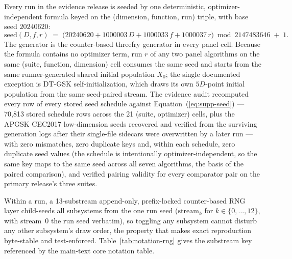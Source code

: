 \documentclass[algorithms,article,submit,moreauthors,pdftex]{Definitions/mdpi}
\newcommand{\dtgsk}{DT-GSK}
\begin{document}
Every run in the evidence release is seeded by one deterministic,
optimizer-independent formula keyed on the (dimension, function, run)
triple, with base seed $20240620$:
\begin{equation}\label{eq:supp-seed}
\mathrm{seed}(D, f, r) \;=\;
\bigl(20240620 + 1000003\,D + 1000033\,f + 1000037\,r\bigr)
\bmod 2147483646 \;+\; 1 .
\end{equation}
The generator is the counter-based threefry generator in every
panel cell.
Because the formula contains no optimizer term, run $r$ of any two panel
algorithms on the same (suite, function, dimension) cell consumes the
same seed and starts from the same runner-generated shared initial
population $X_{0}$; the single documented exception is \dtgsk{}
self-initialization, which draws its own $5D$-point initial population
from the same seed-paired stream.
The evidence audit recomputed every row of every stored seed
schedule against Equation~(\ref{eq:supp-seed}) --- 70{,}813 stored schedule rows
across the 21 (suite, optimizer) cells, plus the APGSK CEC2017
low-dimension seeds recovered and verified from the surviving generation
logs after their single-file sidecars were overwritten by a later run --- with zero mismatches, zero
duplicate keys and, within each schedule, zero duplicate seed values (the
schedule is intentionally optimizer-independent, so the same key maps to
the same seed across all seven algorithms, the basis of the paired
comparison), and verified pairing validity for every comparator pair on
the primary release's three suites.

Within a run, a 13-substream append-only, prefix-locked counter-based
RNG layer child-seeds all subsystems from the one run seed
($\mathrm{stream}_{k}$ for $k \in \{0, \dots, 12\}$, with stream~0 the
run seed verbatim), so toggling any subsystem cannot disturb any other
subsystem's draw order, the property that makes exact reproduction
byte-stable and test-enforced. Table~\ref{tab:notation-rng} gives the
substream key referenced by the main-text core notation table.
\end{document}
